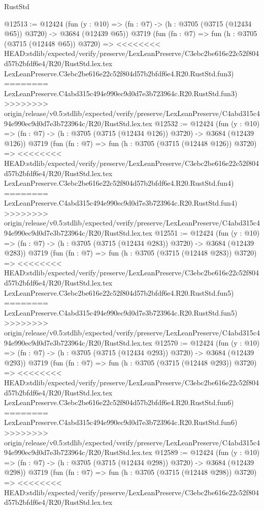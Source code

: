 \begin{lexlean}{RustStd}
\begin{coremodule}
{\begin{coremodule}
{{{{{{{{{{{{{{@12513 := @12424
    (fun (y : @10) => (fn : @7) -> (h : @3705 (@3715 (@12434 @65)) @3720) -> @3684 (@12439 @65))
    @3719
    (fun (fn : @7) =>
    fun (h : @3705 (@3715 (@12448 @65)) @3720) =>
<<<<<<<< HEAD:stdlib/expected/verify/preserve/LexLeanPreserve/C3ebc2be616e22c52f804d57b2bfdf6e4/R20/RustStd.lex.tex
    LexLeanPreserve.C3ebc2be616e22c52f804d57b2bfdf6e4.R20.RustStd.fun3)
========
    LexLeanPreserve.C4abd315c494e990ec9d0d7e3b723964c.R20.RustStd.fun3)
>>>>>>>> origin/release/v0.5:stdlib/expected/verify/preserve/LexLeanPreserve/C4abd315c494e990ec9d0d7e3b723964c/R20/RustStd.lex.tex
@12532 := @12424
    (fun (y : @10) => (fn : @7) -> (h : @3705 (@3715 (@12434 @126)) @3720) -> @3684 (@12439 @126))
    @3719
    (fun (fn : @7) =>
    fun (h : @3705 (@3715 (@12448 @126)) @3720) =>
<<<<<<<< HEAD:stdlib/expected/verify/preserve/LexLeanPreserve/C3ebc2be616e22c52f804d57b2bfdf6e4/R20/RustStd.lex.tex
    LexLeanPreserve.C3ebc2be616e22c52f804d57b2bfdf6e4.R20.RustStd.fun4)
========
    LexLeanPreserve.C4abd315c494e990ec9d0d7e3b723964c.R20.RustStd.fun4)
>>>>>>>> origin/release/v0.5:stdlib/expected/verify/preserve/LexLeanPreserve/C4abd315c494e990ec9d0d7e3b723964c/R20/RustStd.lex.tex
@12551 := @12424
    (fun (y : @10) => (fn : @7) -> (h : @3705 (@3715 (@12434 @283)) @3720) -> @3684 (@12439 @283))
    @3719
    (fun (fn : @7) =>
    fun (h : @3705 (@3715 (@12448 @283)) @3720) =>
<<<<<<<< HEAD:stdlib/expected/verify/preserve/LexLeanPreserve/C3ebc2be616e22c52f804d57b2bfdf6e4/R20/RustStd.lex.tex
    LexLeanPreserve.C3ebc2be616e22c52f804d57b2bfdf6e4.R20.RustStd.fun5)
========
    LexLeanPreserve.C4abd315c494e990ec9d0d7e3b723964c.R20.RustStd.fun5)
>>>>>>>> origin/release/v0.5:stdlib/expected/verify/preserve/LexLeanPreserve/C4abd315c494e990ec9d0d7e3b723964c/R20/RustStd.lex.tex
@12570 := @12424
    (fun (y : @10) => (fn : @7) -> (h : @3705 (@3715 (@12434 @293)) @3720) -> @3684 (@12439 @293))
    @3719
    (fun (fn : @7) =>
    fun (h : @3705 (@3715 (@12448 @293)) @3720) =>
<<<<<<<< HEAD:stdlib/expected/verify/preserve/LexLeanPreserve/C3ebc2be616e22c52f804d57b2bfdf6e4/R20/RustStd.lex.tex
    LexLeanPreserve.C3ebc2be616e22c52f804d57b2bfdf6e4.R20.RustStd.fun6)
========
    LexLeanPreserve.C4abd315c494e990ec9d0d7e3b723964c.R20.RustStd.fun6)
>>>>>>>> origin/release/v0.5:stdlib/expected/verify/preserve/LexLeanPreserve/C4abd315c494e990ec9d0d7e3b723964c/R20/RustStd.lex.tex
@12589 := @12424
    (fun (y : @10) => (fn : @7) -> (h : @3705 (@3715 (@12434 @298)) @3720) -> @3684 (@12439 @298))
    @3719
    (fun (fn : @7) =>
    fun (h : @3705 (@3715 (@12448 @298)) @3720) =>
<<<<<<<< HEAD:stdlib/expected/verify/preserve/LexLeanPreserve/C3ebc2be616e22c52f804d57b2bfdf6e4/R20/RustStd.lex.tex
}}}}}}}}}}}}}}
\end{coremodule}}
\end{coremodule}
\end{lexlean}
